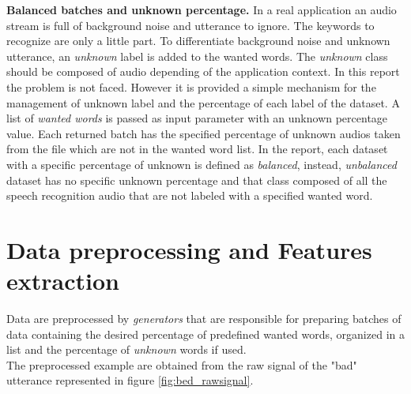 \noindent \textbf{Balanced batches and unknown percentage.} In a real application an audio stream is full of background noise and utterance to ignore. The keywords to recognize are only a little part. To differentiate background noise and unknown utterance, an \textit{unknown} label is added to the wanted words. The \textit{unknown} class should be composed of audio depending of the application context. In this report the problem is not faced. However it is provided a simple mechanism for the management of unknown label and the percentage of each label of the dataset. A list of \textit{wanted words} is passed as input parameter with an unknown percentage value. Each returned batch has the specified percentage of unknown audios taken from the file which are not in the wanted word list. In the report, each dataset with a specific percentage of unknown is defined as \textit{balanced}, instead, \textit{unbalanced} dataset has no specific unknown percentage and that class composed of all the speech recognition audio that are not labeled with a specified wanted word.


\section{Data preprocessing and Features extraction}
\label{sec:model}

\noindent Data are preprocessed by \textit{generators} that are responsible for preparing batches of data containing the desired percentage of predefined wanted words, organized in a list and the percentage of \textit{unknown} words if used.\\
The preprocessed example are obtained from the raw signal of the "bad" utterance represented in figure \ref{fig:bed_rawsignal}.\\


